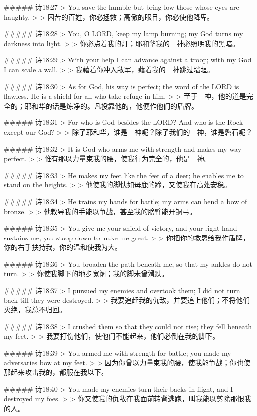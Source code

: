 ##### 诗18:27
> You save the humble but bring low those whose eyes are haughty.
>
> 困苦的百姓，你必拯救；高傲的眼目，你必使他降卑。


##### 诗18:28
> You, O LORD, keep my lamp burning; my God turns my darkness into light.
>
> 你必点着我的灯；耶和华我的　神必照明我的黑暗。


##### 诗18:29
> With your help I can advance against a troop; with my God I can scale a wall.
>
> 我藉着你冲入敌军，藉着我的　神跳过墙垣。


##### 诗18:30
> As for God, his way is perfect; the word of the LORD is flawless. He is a shield for all who take refuge in him.
>
> 至于　神，他的道是完全的；耶和华的话是炼净的。凡投靠他的，他便作他们的盾牌。


##### 诗18:31
> For who is God besides the LORD? And who is the Rock except our God?
>
> 除了耶和华，谁是　神呢？除了我们的　神，谁是磐石呢？


##### 诗18:32
> It is God who arms me with strength and makes my way perfect.
>
> 惟有那以力量束我的腰，使我行为完全的，他是　神。


##### 诗18:33
> He makes my feet like the feet of a deer; he enables me to stand on the heights.
>
> 他使我的脚快如母鹿的蹄，又使我在高处安稳。


##### 诗18:34
> He trains my hands for battle; my arms can bend a bow of bronze.
>
> 他教导我的手能以争战，甚至我的膀臂能开铜弓。


##### 诗18:35
> You give me your shield of victory, and your right hand sustains me; you stoop down to make me great.
>
> 你把你的救恩给我作盾牌，你的右手扶持我，你的温和使我为大。


##### 诗18:36
> You broaden the path beneath me, so that my ankles do not turn.
>
> 你使我脚下的地步宽阔；我的脚未曾滑跌。


##### 诗18:37
> I pursued my enemies and overtook them; I did not turn back till they were destroyed.
>
> 我要追赶我的仇敌，并要追上他们；不将他们灭绝，我总不归回。


##### 诗18:38
> I crushed them so that they could not rise; they fell beneath my feet.
>
> 我要打伤他们，使他们不能起来，他们必倒在我的脚下。


##### 诗18:39
> You armed me with strength for battle; you made my adversaries bow at my feet.
>
> 因为你曾以力量束我的腰，使我能争战；你也使那起来攻击我的，都服在我以下。


##### 诗18:40
> You made my enemies turn their backs in flight, and I destroyed my foes.
>
> 你又使我的仇敌在我面前转背逃跑，叫我能以剪除那恨我的人。


